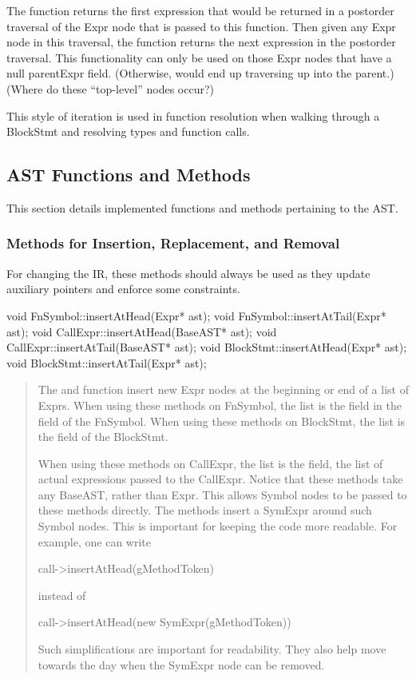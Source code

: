 \documentclass[10pt]{article}
\begin{document}
The function  returns the first expression that would
be returned in a postorder traversal of the Expr node that is passed
to this function.  Then given any Expr node in this traversal, the
function  returns the next expression in the postorder
traversal.  This functionality can only be used on those Expr
nodes that have a null parentExpr field.  (Otherwise,
 would end up traversing up into the parent.)
(Where do these ``top-level'' nodes occur?)

This style of iteration is used in function resolution when walking
through a BlockStmt and resolving types and function calls.

\subsection{AST Functions and Methods}

This section details implemented functions and methods pertaining to
the AST.

\subsubsection{Methods for Insertion, Replacement, and Removal}
\label{sec:inserts}

For changing the IR, these methods should always be used as they
update auxiliary pointers and enforce some constraints.

\begin{clang}
void FnSymbol::insertAtHead(Expr* ast);
void FnSymbol::insertAtTail(Expr* ast);
void CallExpr::insertAtHead(BaseAST* ast);
void CallExpr::insertAtTail(BaseAST* ast);
void BlockStmt::insertAtHead(Expr* ast);
void BlockStmt::insertAtTail(Expr* ast);
\end{clang}
\begin{quote}
The  and  function insert new
Expr nodes at the beginning or end of a list of Exprs.  When using
these methods on FnSymbol, the list is the  field in the
 field of the FnSymbol.  When using these methods
on BlockStmt, the list is the  field of the BlockStmt.

When using these methods on CallExpr, the list is the 
field, the list of actual expressions passed to the CallExpr.  Notice
that these methods take any BaseAST, rather than Expr.  This allows
Symbol nodes to be passed to these methods directly.  The methods
insert a SymExpr around such Symbol nodes.  This is important for
keeping the code more readable.  For example, one can write
\begin{clang}
call->insertAtHead(gMethodToken)
\end{clang}
instead of
\begin{clang}
call->insertAtHead(new SymExpr(gMethodToken))
\end{clang}
Such simplifications are important for readability.  They also help
move towards the day when the SymExpr node can be removed.
\end{quote}
\end{document}
